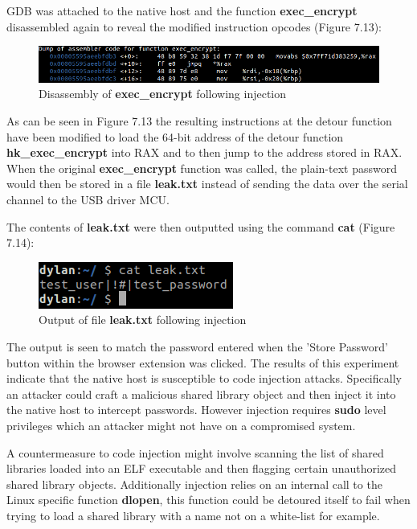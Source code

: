 GDB was attached to the native host and the function \textbf{exec\_encrypt} disassembled again to reveal the modified instruction opcodes (Figure 7.13):

\begin{figure}[H]
\centering
\includegraphics[width=1\columnwidth]{Figures/Fig_41.png}
\caption{Disassembly of \textbf{exec\_encrypt} following injection}
\label{fig:gantt}
\end{figure}

As can be seen in Figure 7.13 the resulting instructions at the detour function have been modified to load the 64-bit address of the detour function \textbf{hk\_exec\_encrypt} into RAX and to then jump to the address stored in RAX. When the original \textbf{exec\_encrypt} function was called, the plain-text password would then be stored in a file \textbf{leak.txt} instead of sending the data over the serial channel to the USB driver MCU.

The contents of \textbf{leak.txt} were then outputted using the command \textbf{cat} (Figure 7.14):

\begin{figure}[H]
\centering
\includegraphics[width=0.45\columnwidth]{Figures/Fig_85.png}
\caption{Output of file \textbf{leak.txt} following injection}
\label{fig:gantt}
\end{figure}

The output is seen to match the password entered when the 'Store Password' button within the browser extension was clicked. The results of this experiment indicate that the native host is susceptible to code injection attacks. Specifically an attacker could craft a malicious shared library object and then inject it into the native host to intercept passwords. However injection requires \textbf{sudo} level privileges which an attacker might not have on a compromised system. 

A countermeasure to code injection might involve scanning the list of shared libraries loaded into an ELF executable and then flagging certain unauthorized shared library objects. Additionally injection relies on an internal call to the Linux specific function \textbf{dlopen}, this function could be detoured itself to fail when trying to load a shared library with a name not on a white-list for example.

